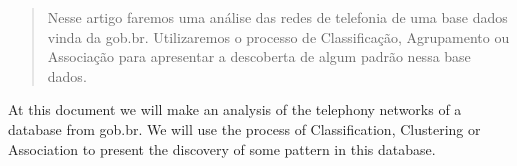 \begin{abstract}
    Nesse artigo faremos uma análise das redes de telefonia de uma base dados vinda da gob.br. Utilizaremos o processo de Classificação, Agrupamento ou Associação para apresentar a descoberta de algum padrão nessa base dados. 
  \end{abstract}
       
  \begin{resumo} 
    At this document we will make an analysis of the telephony networks of a database from gob.br. We will use the process of Classification, Clustering or Association to present the discovery of some pattern in this database.
  \end{resumo}